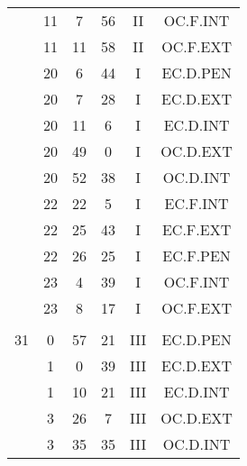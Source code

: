 \documentclass[12pt, a4paper]{article}
\begin{document}
\begin{multicols}{3}
{\begin{tabular}{c c c c c c}
	 	 	 	 & 11 & 7 & 56 & II & OC.F.INT\\%
	 	 	 	 & 11 & 11 & 58 & II & OC.F.EXT\\%
	 	 	 	 & 20 & 6 & 44 & I & EC.D.PEN\\%
	 	 	 	 & 20 & 7 & 28 & I & EC.D.EXT\\%
	 	 	 	 & 20 & 11 & 6 & I & EC.D.INT\\%
	 	 	 	 & 20 & 49 & 0 & I & OC.D.EXT\\%
	 	 	 	 & 20 & 52 & 38 & I & OC.D.INT\\%
	 	 	 	 & 22 & 22 & 5 & I & EC.F.INT\\%
	 	 	 	 & 22 & 25 & 43 & I & EC.F.EXT\\%
	 	 	 	 & 22 & 26 & 25 & I & EC.F.PEN\\%
	 	 	 	 & 23 & 4 & 39 & I & OC.F.INT\\%
	 	 	 	 & 23 & 8 & 17 & I & OC.F.EXT\\%
	 	 	 	 & & & & & \\%
	 	 	 	31 & 0 & 57 & 21 & III & EC.D.PEN\\%
	 	 	 	 & 1 & 0 & 39 & III & EC.D.EXT\\%
	 	 	 	 & 1 & 10 & 21 & III & EC.D.INT\\%
	 	 	 	 & 3 & 26 & 7 & III & OC.D.EXT\\%
	 	 	 	 & 3 & 35 & 35 & III & OC.D.INT\\%
	 	 \end{tabular}
 	}
\end{multicols}
\end{document}
